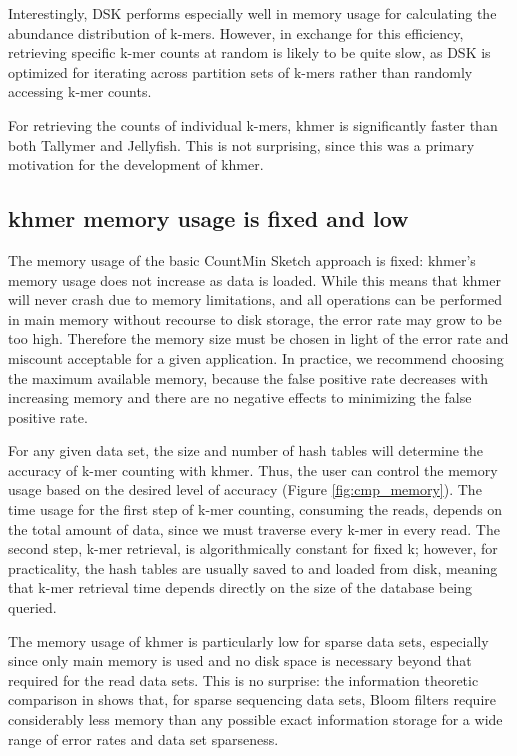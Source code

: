 \documentclass[10pt]{article}
\begin{document}
Interestingly, DSK performs especially well in memory usage
for calculating the abundance distribution of k-mers. However, in
exchange for this efficiency, retrieving specific k-mer counts at
random is likely to be quite slow, as DSK is optimized for iterating
across partition sets of k-mers rather than randomly accessing k-mer
counts.

For retrieving the counts of individual k-mers, khmer is significantly faster than both
Tallymer and Jellyfish.  This is not surprising, since this was a
primary motivation for the development of khmer.

\subsection*{khmer memory usage is fixed and low}

The memory usage of the basic CountMin Sketch approach is fixed:
khmer's memory usage does not increase as data is loaded. While this
means that khmer will never crash due to memory limitations, and all
operations can be performed in main memory without recourse to disk
storage, the error rate may grow to be too high.  Therefore the memory
size must be chosen in light of the error rate and miscount acceptable
for a given application.  In practice, we recommend choosing the
maximum available memory, because the false positive rate decreases
with increasing memory and there are no negative effects to minimizing
the false positive rate.

For any given data set, the size and number of hash tables will
determine the accuracy of k-mer counting with khmer.  Thus, the user
can control the memory usage based on the desired level of
accuracy (Figure \ref{fig:cmp_memory}). The time usage for the first step of k-mer counting,
consuming the reads, depends on the
total amount of data, since we must traverse every k-mer in every read.
The second step, k-mer retrieval, is algorithmically constant for
fixed k; however, for practicality, the hash tables are usually saved
to and loaded from disk, meaning that k-mer retrieval time depends directly
on the size of the database being queried.

The memory usage of khmer is particularly low for sparse data sets,
especially since only main memory is used and no disk space is
necessary beyond that required for the read data sets.  This is no
surprise: the information theoretic comparison in
\cite{Pell2012} shows that, for sparse sequencing data sets, Bloom
filters require considerably less memory than any possible exact
information storage for a wide range of error rates and data set
sparseness.
\end{document}

